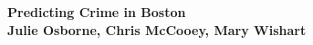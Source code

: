 \documentclass[a0,landscape]{a0poster}
\newcommand{\1}{\bold{1}}
\begin{document}




 


\begin{minipage}[b]{1.5\linewidth}
\begin{vwcol}[widths={0.35,0.65},sep=.8cm, justify=flush,rule=0pt,indent=1em]
\Huge \color{Blue} \textbf{Predicting Crime in Boston} \color{Black}\\ %
\huge \color{Black}\textbf{Julie Osborne, Chris McCooey, Mary Wishart}    
\vfill\null


\end{vwcol}
      
\end{minipage}
%
%
\end{document}
